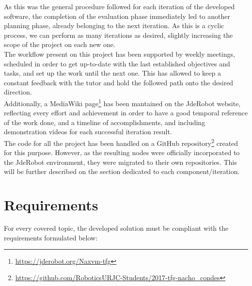 As this was the general procedure followed for each iteration of the developed software, the completion of the evaluation phase immediately led to another planning phase, already belonging to the next iteration. As this is a cyclic process, we can perform as many iterations as desired, slightly increasing the scope of the project on each new one.\\

The workflow present on this project has been supported by weekly meetings, scheduled in order to get up-to-date with the last established objectives and tasks, and set up the work until the next one. This has allowed to keep a constant feedback with the tutor and hold the followed path onto the desired direction.\\


Additionally, a MediaWiki page\footnote{\url{https://jderobot.org/Naxvm-tfg}} has been mantained on the JdeRobot website, reflecting every effort and achievement in order to have a good temporal reference of the work done, and a timeline of accomplishments, and including demonstration videos for each successful iteration result.\\

The code for all the project has been handled on a GitHub repository\footnote{\url{https://github.com/RoboticsURJC-Students/2017-tfg-nacho\_condes}} created for this purpose. However, as the resulting nodes were officially incorporated to the JdeRobot environment, they were migrated to their own repositories. This will be further described on the section dedicated to each component/iteration.\\


\section{Requirements}
\label{sec:2_requirements}
For every covered topic, the developed solution must be compliant with the requirements formulated below:

